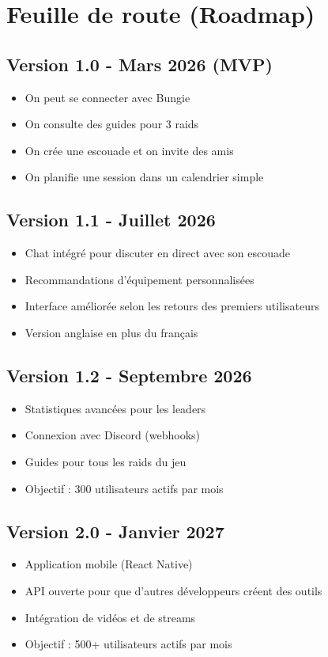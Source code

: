 \section{Feuille de route (Roadmap)}

\subsection*{Version 1.0 - Mars 2026 (MVP)}
\begin{itemize}
    \item On peut se connecter avec Bungie
    \item On consulte des guides pour 3 raids
    \item On crée une escouade et on invite des amis
    \item On planifie une session dans un calendrier simple
\end{itemize}

\subsection*{Version 1.1 - Juillet 2026}
\begin{itemize}
    \item Chat intégré pour discuter en direct avec son escouade
    \item Recommandations d'équipement personnalisées
    \item Interface améliorée selon les retours des premiers utilisateurs
    \item Version anglaise en plus du français
\end{itemize}

\subsection*{Version 1.2 - Septembre 2026}
\begin{itemize}
    \item Statistiques avancées pour les leaders
    \item Connexion avec Discord (webhooks)
    \item Guides pour tous les raids du jeu
    \item Objectif : 300 utilisateurs actifs par mois
\end{itemize}

\subsection*{Version 2.0 - Janvier 2027}
\begin{itemize}
    \item Application mobile (React Native)
    \item API ouverte pour que d'autres développeurs créent des outils
    \item Intégration de vidéos et de streams
    \item Objectif : 500+ utilisateurs actifs par mois
\end{itemize}